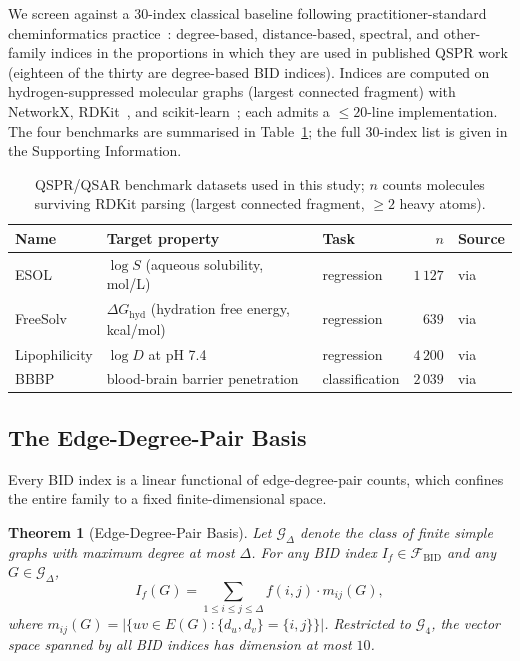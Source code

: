 \documentclass[11pt,a4paper]{article}
\newtheorem{theorem}{Theorem}[section]
\theoremstyle{definition}
\newcommand{\bid}{\mathcal{F}_{\mathrm{BID}}}
\begin{document}
We screen against a $30$-index classical baseline following
practitioner-standard cheminformatics
practice~\cite{TodeschiniConsonniHandbook}: degree-based,
distance-based, spectral, and other-family indices in the
proportions in which they are used in published QSPR work
(eighteen of the thirty are degree-based BID indices). Indices are
computed on hydrogen-suppressed molecular graphs (largest connected
fragment) with NetworkX, RDKit~\cite{RDKit}, and
scikit-learn~\cite{Pedregosa2011sklearn}; each admits a
$\le 20$-line implementation. The four benchmarks are summarised in
Table~\ref{tab:datasets}; the full $30$-index list is given in the
Supporting Information.

\begin{table}[h]
\centering
\caption{QSPR/QSAR benchmark datasets used in this study; $n$ counts molecules surviving RDKit parsing (largest connected fragment, $\ge 2$ heavy atoms).}
\label{tab:datasets}
\begin{tabular}{lllrl}
\toprule
Name & Target property & Task & $n$ & Source\\
\midrule
ESOL          & $\log S$ (aqueous solubility, mol/L)         & regression     & $1\,127$ & \cite{Delaney2004ESOL} via \cite{MoleculeNet}\\
FreeSolv      & $\Delta G_{\mathrm{hyd}}$ (hydration free energy, kcal/mol) & regression & $639$    & \cite{Mobley2014FreeSolv} via \cite{MoleculeNet}\\
Lipophilicity & $\log D$ at pH 7.4                            & regression     & $4\,200$ & \cite{LipophilicityChEMBL} via \cite{MoleculeNet}\\
BBBP          & blood-brain barrier penetration               & classification & $2\,039$ & \cite{Martins2012BBBP} via \cite{MoleculeNet}\\
\bottomrule
\end{tabular}
\end{table}

\subsection{The Edge-Degree-Pair Basis}

Every BID index is a linear functional of edge-degree-pair counts,
which confines the entire family to a fixed finite-dimensional
space.

\begin{theorem}[Edge-Degree-Pair Basis]\label{thm:bid}
Let $\mathcal{G}_\Delta$ denote the class of finite simple graphs
with maximum degree at most $\Delta$. For any BID index
$I_f\in\bid$ and any $G\in\mathcal{G}_\Delta$,
\begin{equation}\label{eq:bid_linear}
I_f(G)=\sum_{1\le i\le j\le\Delta} f(i,j)\cdot m_{ij}(G),
\end{equation}
where $m_{ij}(G)=\bigl|\{uv\in E(G):\{d_u,d_v\}=\{i,j\}\}\bigr|$.
Restricted to $\mathcal{G}_4$, the vector space spanned by all BID
indices has dimension at most $10$.
\end{theorem}
\end{document}
